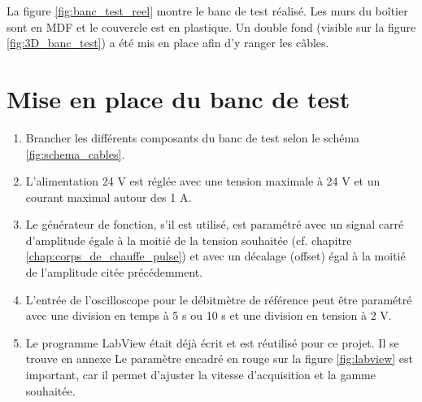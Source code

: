 La figure \ref{fig:banc_test_reel} montre le banc de test réalisé. Les murs du boîtier sont en MDF et le couvercle est en plastique. Un double 
fond (visible sur la figure \ref{fig:3D_banc_test}) a été mis en place afin d'y ranger les câbles. 

\newpage
\section{Mise en place du banc de test}
\begin{enumerate}
    \item Brancher les différents composants du banc de test selon le schéma \ref{fig:schema_cables}.
    \item L'alimentation 24 V est réglée avec une tension maximale à 24 V et un courant maximal autour des 1 A.
    \item Le générateur de fonction, s'il est utilisé, est paramétré avec un signal carré d'amplitude égale à la moitié de la tension souhaitée
          (cf. chapitre \ref{chap:corps_de_chauffe_pulse}) et avec un décalage (offset) égal à la moitié de l'amplitude citée précédemment. 
    \item L'entrée de l'oscilloscope pour le débitmètre de référence peut être paramétré avec une division en temps à 5 s ou 10 s et une division
          en tension à 2 V. 
    \item Le programme LabView était déjà écrit et est réutilisé pour ce projet. Il se trouve en annexe
          Le paramètre encadré en rouge sur la figure \ref{fig:labview} est important, car il permet d'ajuster la vitesse d'acquisition et la gamme souhaitée. 
          

\end{enumerate}
